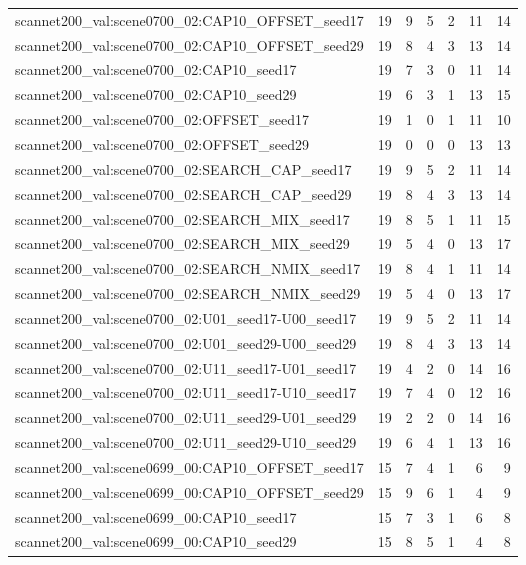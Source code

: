 \begin{table}[t]
\begin{tabular}{lrrrrrr}
scannet200\_val:scene0700\_02:CAP10\_OFFSET\_seed17 & 19 & 9 & 5 & 2 & 11 & 14 \\
scannet200\_val:scene0700\_02:CAP10\_OFFSET\_seed29 & 19 & 8 & 4 & 3 & 13 & 14 \\
scannet200\_val:scene0700\_02:CAP10\_seed17 & 19 & 7 & 3 & 0 & 11 & 14 \\
scannet200\_val:scene0700\_02:CAP10\_seed29 & 19 & 6 & 3 & 1 & 13 & 15 \\
scannet200\_val:scene0700\_02:OFFSET\_seed17 & 19 & 1 & 0 & 1 & 11 & 10 \\
scannet200\_val:scene0700\_02:OFFSET\_seed29 & 19 & 0 & 0 & 0 & 13 & 13 \\
scannet200\_val:scene0700\_02:SEARCH\_CAP\_seed17 & 19 & 9 & 5 & 2 & 11 & 14 \\
scannet200\_val:scene0700\_02:SEARCH\_CAP\_seed29 & 19 & 8 & 4 & 3 & 13 & 14 \\
scannet200\_val:scene0700\_02:SEARCH\_MIX\_seed17 & 19 & 8 & 5 & 1 & 11 & 15 \\
scannet200\_val:scene0700\_02:SEARCH\_MIX\_seed29 & 19 & 5 & 4 & 0 & 13 & 17 \\
scannet200\_val:scene0700\_02:SEARCH\_NMIX\_seed17 & 19 & 8 & 4 & 1 & 11 & 14 \\
scannet200\_val:scene0700\_02:SEARCH\_NMIX\_seed29 & 19 & 5 & 4 & 0 & 13 & 17 \\
scannet200\_val:scene0700\_02:U01\_seed17-U00\_seed17 & 19 & 9 & 5 & 2 & 11 & 14 \\
scannet200\_val:scene0700\_02:U01\_seed29-U00\_seed29 & 19 & 8 & 4 & 3 & 13 & 14 \\
scannet200\_val:scene0700\_02:U11\_seed17-U01\_seed17 & 19 & 4 & 2 & 0 & 14 & 16 \\
scannet200\_val:scene0700\_02:U11\_seed17-U10\_seed17 & 19 & 7 & 4 & 0 & 12 & 16 \\
scannet200\_val:scene0700\_02:U11\_seed29-U01\_seed29 & 19 & 2 & 2 & 0 & 14 & 16 \\
scannet200\_val:scene0700\_02:U11\_seed29-U10\_seed29 & 19 & 6 & 4 & 1 & 13 & 16 \\
scannet200\_val:scene0699\_00:CAP10\_OFFSET\_seed17 & 15 & 7 & 4 & 1 & 6 & 9 \\
scannet200\_val:scene0699\_00:CAP10\_OFFSET\_seed29 & 15 & 9 & 6 & 1 & 4 & 9 \\
scannet200\_val:scene0699\_00:CAP10\_seed17 & 15 & 7 & 3 & 1 & 6 & 8 \\
scannet200\_val:scene0699\_00:CAP10\_seed29 & 15 & 8 & 5 & 1 & 4 & 8 \\

\end{tabular}
\end{table}
